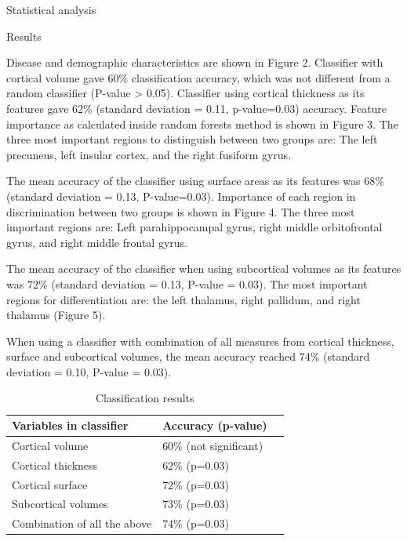 \documentclass[final]{beamer}
\newlength{\onecolwid}
\newlength{\twocolwid}
\begin{document}
\begin{frame}[t]
\begin{columns}[t]
\begin{column}{\twocolwid}
\begin{columns}[t,totalwidth=\twocolwid]
\begin{column}{\onecolwid}
\begin{block}{Statistical analysis}
\end{block}



\begin{block}{Results}

Disease and demographic characteristics are shown in Figure 2.
Classifier with cortical volume gave 60\% classification accuracy, which was not different from a random classifier (P-value > 0.05). Classifier using cortical thickness as its features gave 62\% (standard deviation = 0.11, p-value=0.03) accuracy. Feature importance as calculated inside random forests method is shown in Figure 3. The three most important regions to distinguish between two groups are: The left precuneus, left insular cortex, and the right fusiform gyrus.

The mean accuracy of the classifier using surface areas as its features was 68\% (standard deviation = 0.13, P-value=0.03). Importance of each region in discrimination between two groups is shown in Figure 4. The three most important regions are: Left parahippocampal gyrus, right middle orbitofrontal gyrus, and right middle frontal gyrus.

The mean accuracy of the classifier when using subcortical volumes as its features was 72\% (standard deviation = 0.13, P-value = 0.03). The most important regions for differentiation are: the left thalamus, right pallidum, and right thalamus (Figure 5).

When using a classifier with combination of all measures from cortical thickness, surface and subcortical volumes, the mean accuracy reached 74\% (standard deviation = 0.10, P-value = 0.03).




\begin{table}
\vspace{4ex}
\begin{tabular}{l l l}
\toprule
\textbf{Variables in classifier} & {Accuracy (p-value)}\\
\midrule
Cortical volume & 60\% (not significant) \\
Cortical thickness & 62\% (p=0.03) \\
Cortical surface & 72\% (p=0.03) \\
Subcortical volumes & 73\% (p=0.03) \\
Combination of all the above & 74\% (p=0.03) \\
\bottomrule
\end{tabular}
\caption{Classification results}
\end{table}


\end{block}
\end{column}
\end{columns}
\end{column}
\end{columns}
\end{frame}
\end{document}
